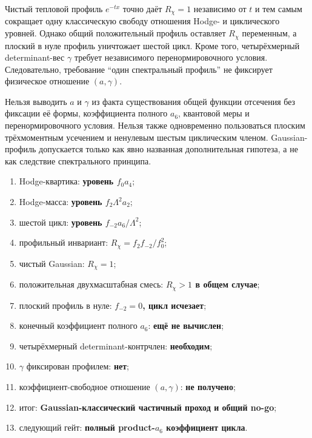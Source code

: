 \begin{theorem}
Чистый тепловой профиль $e^{-tx}$ точно даёт $R_\chi=1$ независимо от
$t$ и тем самым сокращает одну классическую свободу отношения Hodge- и
циклического уровней. Однако общий положительный профиль оставляет
$R_\chi$ переменным, а плоский в нуле профиль уничтожает шестой цикл.
Кроме того, четырёхмерный determinant-вес $\gamma$ требует независимого
перенормировочного условия. Следовательно, требование ``один спектральный
профиль'' не фиксирует физическое отношение $(a,\gamma)$.
\end{theorem}

\begin{nogocriterion}
Нельзя выводить $a$ и $\gamma$ из факта существования общей функции
отсечения без фиксации её формы, коэффициента полного $a_6$, квантовой меры
и перенормировочного условия. Нельзя также одновременно пользоваться
плоским трёхмоментным усечением и ненулевым шестым циклическим членом.
Gaussian-профиль допускается только как явно названная дополнительная
гипотеза, а не как следствие спектрального принципа.
\end{nogocriterion}

\begin{protocol}
\begin{enumerate}
 \item Hodge-квартика: \textbf{уровень $f_0a_4$};
 \item Hodge-масса: \textbf{уровень $f_2\Lambda^2a_2$};
 \item шестой цикл: \textbf{уровень $f_{-2}a_6/\Lambda^2$};
 \item профильный инвариант: \textbf{$R_\chi=f_2f_{-2}/f_0^2$};
 \item чистый Gaussian: \textbf{$R_\chi=1$};
 \item положительная двухмасштабная смесь: \textbf{$R_\chi>1$ в общем случае};
 \item плоский профиль в нуле: \textbf{$f_{-2}=0$, цикл исчезает};
 \item конечный коэффициент полного $a_6$: \textbf{ещё не вычислен};
 \item четырёхмерный determinant-контрчлен: \textbf{необходим};
 \item $\gamma$ фиксирован профилем: \textbf{нет};
 \item коэффициент-свободное отношение $(a,\gamma)$: \textbf{не получено};
 \item итог: \textbf{Gaussian-классический частичный проход и общий no-go};
 \item следующий гейт: \textbf{полный product-$a_6$ коэффициент цикла}.
\end{enumerate}
\end{protocol}

